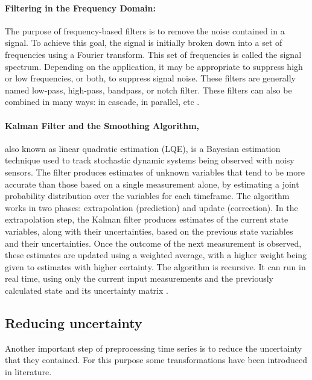 \paragraph{Filtering in the Frequency Domain:}   The purpose of frequency-based filters is to remove the noise contained in a signal. To achieve this goal, the signal is initially broken down into a set of frequencies using a Fourier transform. This set of frequencies is called the signal spectrum. Depending on the application, it may be appropriate to suppress high or low frequencies, or both, to suppress signal noise. These filters are generally named low-pass, high-pass, bandpass, or notch filter. These filters can also be combined in many ways: in cascade, in parallel, etc \cite{buttkus2012spectral}.

\paragraph{Kalman Filter and the Smoothing Algorithm,} also known as linear quadratic estimation (LQE), is a Bayesian estimation technique used to track stochastic dynamic systems being observed with noisy sensors. The filter produces estimates of unknown variables that tend to be more accurate than those based on a single measurement alone, by estimating a joint probability distribution over the variables for each timeframe. The algorithm works in two phases: extrapolation (prediction) and update (correction). In the extrapolation step, the Kalman filter produces estimates of the current state variables, along with their uncertainties, based on the previous state variables and their uncertainties. Once the outcome of the next measurement is observed, these estimates are updated using a weighted average, with a higher weight being given to estimates with higher certainty. The algorithm is recursive. It can run in real time, using only the current input measurements and the previously calculated state and its uncertainty matrix \cite{matthies1989kalman}.



\subsection{Reducing uncertainty}
Another important step of preprocessing time series is to reduce the uncertainty that they contained. For this purpose some transformations have been introduced in literature.


